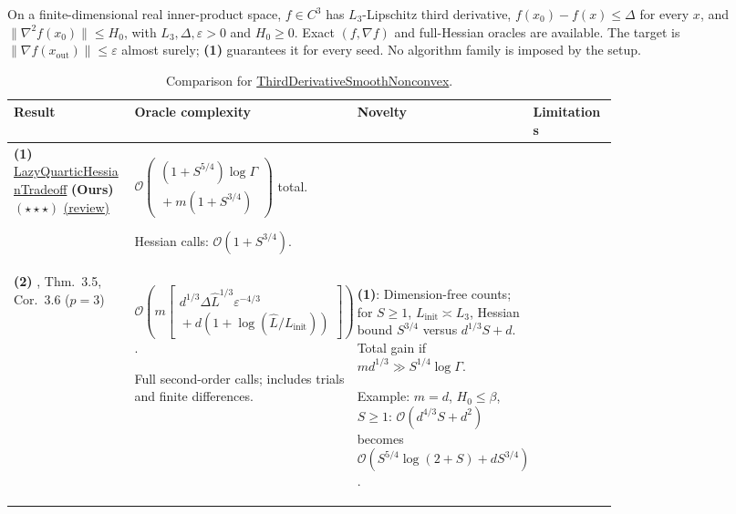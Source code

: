 \begin{table}[tp]
\centering
\caption{Comparison for \href{https://github.com/k3nfalt/longtails/blob/main/LongTails/Setups/ThirdDerivativeSmoothNonconvex.lean}{ThirdDerivativeSmoothNonconvex}.}\label{tab:ThirdDerivativeSmoothNonconvex}
\parbox{\linewidth}{\footnotesize On a finite-dimensional real inner-product space, $f\in C^3$ has $L_3$-Lipschitz third derivative, $f(x_0)-f(x)\leq\Delta$ for every $x$, and $\|\nabla^2f(x_0)\|\leq H_0$, with $L_3,\Delta,\varepsilon>0$ and $H_0\geq0$. Exact $(f,\nabla f)$ and full-Hessian oracles are available. The target is $\|\nabla f(x_{\mathrm{out}})\|\leq\varepsilon$ almost surely; \textbf{(1)} guarantees it for every seed. No algorithm family is imposed by the setup.}\par\smallskip
\begin{threeparttable}
\footnotesize
\setlength{\tabcolsep}{4pt}\renewcommand{\arraystretch}{1.25}
\begin{tabularx}{\linewidth}{@{}>{\raggedright\arraybackslash}p{0.20\linewidth}>{\raggedright\arraybackslash}p{0.32\linewidth}>{\raggedright\arraybackslash}p{0.25\linewidth}>{\raggedright\arraybackslash}X@{}}
\toprule
\textbf{Result} & \textbf{Oracle complexity} & \textbf{Novelty} & \textbf{Limitations} \\
\midrule
\textbf{(1)} \href{https://github.com/k3nfalt/longtails/blob/main/LongTails/Theorems/LazyQuarticHessianTradeoff.lean}{Lazy\allowbreak Quartic\allowbreak Hessian\allowbreak Tradeoff} \textbf{(Ours)} $(\star\star\star)$ \href{https://github.com/k3nfalt/longtails/blob/main/scripts/reviews/LazyQuarticHessianTradeoff.md}{(review)}
& $\mathcal{O}\!\left(\begin{gathered}(1+S^{5/4})\log\Gamma\\{}+m(1+S^{3/4})\end{gathered}\right)$ total.\par Hessian calls: $\mathcal{O}(1+S^{3/4})$.
& & \\
\midrule[1.2pt]
\textbf{(2)} \citep{tdsDoikovGrapiglia2025v1}, Thm.~3.5, Cor.~3.6 ($p=3$)
& $\mathcal{O}\!\left(m\left[\begin{gathered}d^{1/3}\Delta\widehat L^{1/3}\varepsilon^{-4/3}\\{}+d(1+\log(\widehat L/L_{\mathrm{init}}))\end{gathered}\right]\right)$.\par Full second-order calls; includes trials and finite differences.
& \textbf{(1)}: Dimension-free counts; for $S\geq1$, $L_{\mathrm{init}}\asymp L_3$, Hessian bound $S^{3/4}$ versus $d^{1/3}S+d$. Total gain if $md^{1/3}\gg S^{1/4}\log\Gamma$.\par Example: $m=d$, $H_0\leq\beta$, $S\geq1$: $\mathcal{O}(d^{4/3}S+d^2)$ becomes $\mathcal{O}(S^{5/4}\log(2+S)+dS^{3/4})$.

\end{tabularx}
\end{threeparttable}
\end{table}
